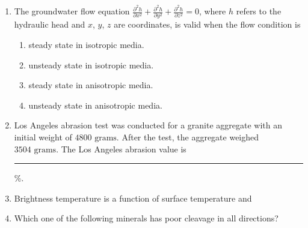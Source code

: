 \documentclass[journal,12pt,onecolumn]{IEEEtran}
\theoremstyle{remark}
\begin{document}
\begin{enumerate}
    \item The groundwater flow equation $\frac{\partial^{2}h}{\partial x^{2}}+\frac{\partial^{2}h}{\partial y^{2}}+\frac{\partial^{2}h}{\partial z^{2}}=0$, where $h$ refers to the hydraulic head and $x$, $y$, $z$ are coordinates, is valid when the flow condition is \hfill{}
        \begin{enumerate} 
            \item steady state in isotropic media.
            \item unsteady state in isotropic media.
            \item steady state in anisotropic media.
            \item unsteady state in anisotropic media.
        \end{enumerate}    
    
    \item Los Angeles abrasion test was conducted for a granite aggregate with an initial weight of $4800\text{ grams}$. After the test, the aggregate weighed $3504\text{ grams}$. The Los Angeles abrasion value is \rule{3cm}{0.15mm} $\%$. \hfill{}    
    
    \item Brightness temperature is a function of surface temperature and \hfill{}
        \begin{enumerate} 
        \end{enumerate}    
    
    \item Which one of the following minerals has poor cleavage in all directions? \hfill{}
        \begin{enumerate} 
        \end{enumerate}
        

\end{enumerate}
\end{document}
